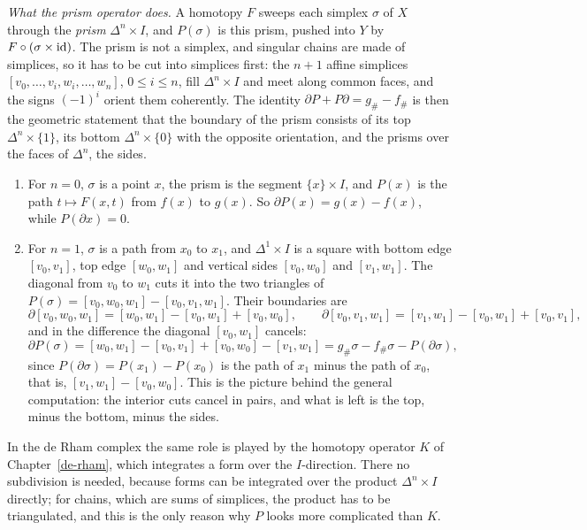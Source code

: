 \begin{remark}\label{singular-homology:remark-prism}
\emph{What the prism operator does.} A homotopy $F$ sweeps each simplex $\sigma$ of $X$ through the \emph{prism} $\Delta^n \times I$, and $P(\sigma)$ is this prism, pushed into $Y$ by $F \circ (\sigma \times \mathrm{id})$.
The prism is not a simplex, and singular chains are made of simplices, so it has to be cut into simplices first: the $n + 1$ affine simplices $[v_0, \ldots, v_i, w_i, \ldots, w_n]$, $0 \leq i \leq n$, fill
$\Delta^n \times I$ and meet along common faces, and the signs $(-1)^i$ orient them coherently. The identity $\partial P + P\partial = g_\# - f_\#$ is then the geometric statement that the boundary of the prism
consists of its top $\Delta^n \times \{1\}$, its bottom $\Delta^n \times \{0\}$ with the opposite orientation, and the prisms over the faces of $\Delta^n$, the sides.
\begin{enumerate}
\item For $n = 0$, $\sigma$ is a point $x$, the prism is the segment $\{x\} \times I$, and $P(x)$ is the path $t \mapsto F(x, t)$ from $f(x)$ to $g(x)$. So $\partial P(x) = g(x) - f(x)$, while $P(\partial x) = 0$.
\item For $n = 1$, $\sigma$ is a path from $x_0$ to $x_1$, and $\Delta^1 \times I$ is a square with bottom edge $[v_0, v_1]$, top edge $[w_0, w_1]$ and vertical sides $[v_0, w_0]$ and $[v_1, w_1]$. The diagonal from $v_0$ to $w_1$
cuts it into the two triangles of $P(\sigma) = [v_0, w_0, w_1] - [v_0, v_1, w_1]$. Their boundaries are
\[
\partial[v_0, w_0, w_1] = [w_0, w_1] - [v_0, w_1] + [v_0, w_0], \qquad \partial[v_0, v_1, w_1] = [v_1, w_1] - [v_0, w_1] + [v_0, v_1],
\]
and in the difference the diagonal $[v_0, w_1]$ cancels:
\[
\partial P(\sigma) = [w_0, w_1] - [v_0, v_1] + [v_0, w_0] - [v_1, w_1] = g_\#\sigma - f_\#\sigma - P(\partial\sigma),
\]
since $P(\partial\sigma) = P(x_1) - P(x_0)$ is the path of $x_1$ minus the path of $x_0$, that is, $[v_1, w_1] - [v_0, w_0]$. This is the picture behind the general computation: the interior cuts cancel in pairs, and what is
left is the top, minus the bottom, minus the sides.
\end{enumerate}
In the de Rham complex the same role is played by the homotopy operator $K$ of Chapter~\ref{de-rham}, which integrates a form over the $I$-direction. There no subdivision is needed, because forms can be
integrated over the product $\Delta^n \times I$ directly; for chains, which are sums of simplices, the product has to be triangulated, and this is the only reason why $P$ looks more complicated than $K$.
\end{remark}

